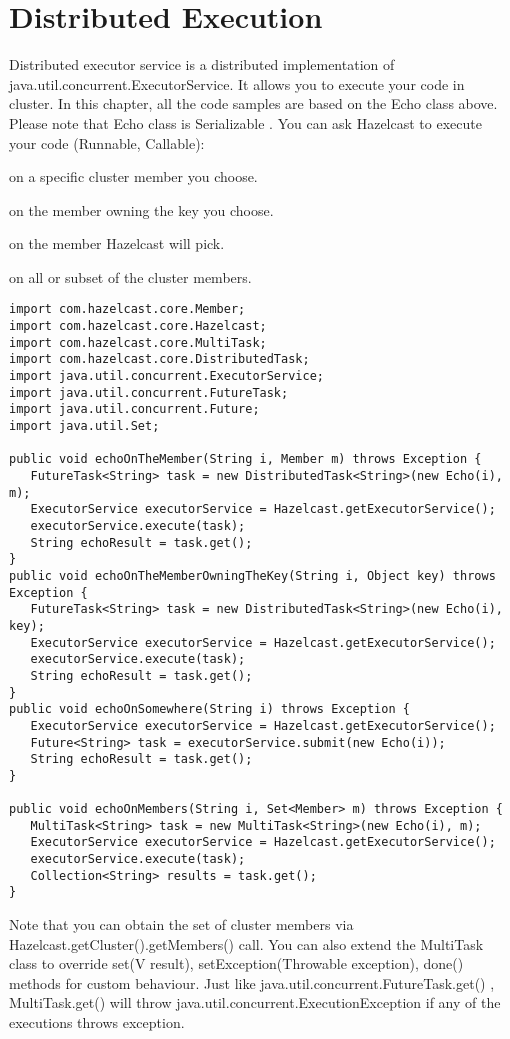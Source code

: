 \section{Distributed Execution}

Distributed executor service is a distributed implementation of java.util.concurrent.ExecutorService. It allows you to execute your code in cluster. In this chapter, all the code samples are based on the Echo class above. Please note that Echo class is Serializable . You can ask Hazelcast to execute your code (Runnable, Callable):

on a specific cluster member you choose.

on the member owning the key you choose.

on the member Hazelcast will pick.

on all or subset of the cluster members.

\begin{verbatim}
import com.hazelcast.core.Member;
import com.hazelcast.core.Hazelcast;
import com.hazelcast.core.MultiTask;
import com.hazelcast.core.DistributedTask;
import java.util.concurrent.ExecutorService;   
import java.util.concurrent.FutureTask;   
import java.util.concurrent.Future;   
import java.util.Set;

public void echoOnTheMember(String i, Member m) throws Exception {
   FutureTask<String> task = new DistributedTask<String>(new Echo(i), m);
   ExecutorService executorService = Hazelcast.getExecutorService();
   executorService.execute(task);
   String echoResult = task.get();
}
public void echoOnTheMemberOwningTheKey(String i, Object key) throws Exception {
   FutureTask<String> task = new DistributedTask<String>(new Echo(i), key);
   ExecutorService executorService = Hazelcast.getExecutorService();
   executorService.execute(task);
   String echoResult = task.get();
}
public void echoOnSomewhere(String i) throws Exception { 
   ExecutorService executorService = Hazelcast.getExecutorService();
   Future<String> task = executorService.submit(new Echo(i));
   String echoResult = task.get();
}

public void echoOnMembers(String i, Set<Member> m) throws Exception {
   MultiTask<String> task = new MultiTask<String>(new Echo(i), m);
   ExecutorService executorService = Hazelcast.getExecutorService();
   executorService.execute(task);
   Collection<String> results = task.get();
} 
\end{verbatim}

Note that you can obtain the set of cluster members via Hazelcast.getCluster().getMembers() call. You can also extend the MultiTask class to override set(V result), setException(Throwable exception), done() methods for custom behaviour. Just like java.util.concurrent.FutureTask.get() , MultiTask.get() will throw java.util.concurrent.ExecutionException if any of the executions throws exception.

